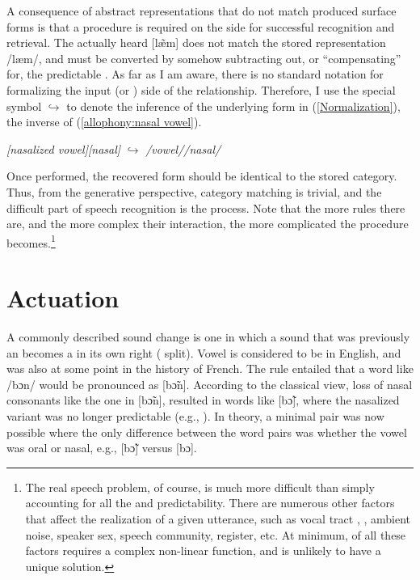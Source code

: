 A consequence of abstract representations that do not match produced
surface forms is that a  procedure is required on the
 side for successful recognition and retrieval. The actually
heard {[læ̃m]} does not match the stored representation
{/læm/}, and must be converted by somehow subtracting out,
or “compensating” for, the predictable . As far as I
am aware, there is no standard notation for formalizing the input
(or ) side of the  relationship. Therefore, I
use the special symbol $\hookrightarrow$ to denote the inference
of the underlying form in (\ref{Normalization}), the inverse of (\ref{allophony:nasal vowel}). 
\begin{covexamples}
\item \label{Normalization} \emph{{[}nasalized vowel{]}{[}nasal{]}}
$\hookrightarrow$ \emph{/vowel//nasal/}
\end{covexamples}
Once performed, the recovered form should be identical to the stored
category. Thus, from the generative perspective, category matching
is trivial, and the difficult part of speech recognition is the 
process. Note that the more rules there are, and the more complex
their interaction, the more complicated the  procedure
becomes.\footnote{The real speech  problem, of course, is much more difficult
than simply accounting for all the  and  predictability.
There are numerous other factors that affect the realization of a
given utterance, such as vocal tract , , ambient
noise, speaker sex, speech community, register, etc. At minimum, 
of all these factors requires a complex non-linear function, and is
unlikely to have a unique solution.} 

\section{\label{sec:Actuation-1}Actuation}

A commonly described sound change is one in which a sound that was
previously an  becomes a  in its own right (
split). Vowel  is considered to be  in English,
and was also  at some point in the history of French. The
 rule entailed that a word like {/bɔn/} would be
pronounced as {[bɔ̃n]}. According to the classical view,
loss of nasal consonants like the one in {[bɔ̃n]}, resulted
in words like {[bɔ̃]}, where the nasalized variant was
no longer predictable (e.g., \citealt{Hajek1997a}). In theory, a
minimal pair was now possible where the only difference between the
word pairs was whether the vowel was oral or nasal, e.g., {[bɔ̃]}
versus {[bɔ]}. 

